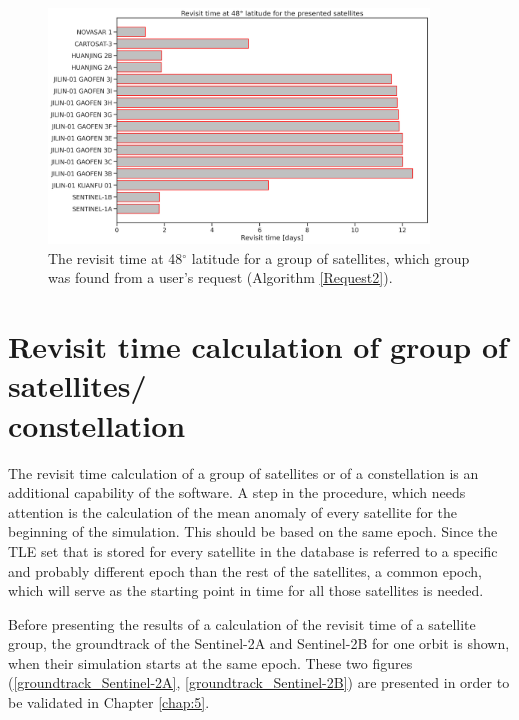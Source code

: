 \begin{figure}
\centering
\includegraphics[width=0.9\textwidth]{Images/revisit_time_at_latitude_48.png}
\caption{The revisit time at 48$^{\circ}$ latitude for a group of satellites, which group was found from a user's request (Algorithm \ref{Request2}).}
\label{revisit_time_at_latitude_48}
\end{figure}

\bigskip
\section{Revisit time calculation of group of satellites/ \\constellation}
\bigskip

The revisit time calculation of a group of satellites or of a constellation is an additional capability of the software. A step in the procedure, which needs attention is the calculation of the mean anomaly of every satellite for the beginning of the simulation. This should be based on the same epoch. Since the TLE set that is stored for every satellite in the database is referred to a specific and probably different epoch than the rest of the satellites, a common epoch, which will serve as the starting point in time for all those satellites is needed.

Before presenting the results of a calculation of the revisit time of a satellite group, the groundtrack of the Sentinel-2A and Sentinel-2B for one orbit is shown, when their simulation starts at the same epoch. These two figures (\ref{groundtrack_Sentinel-2A}, \ref{groundtrack_Sentinel-2B}) are presented in order to be validated in Chapter \ref{chap:5}. 

